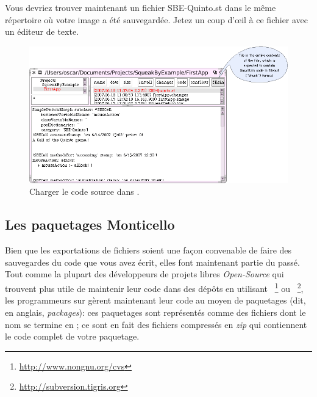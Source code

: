 \documentclass[a4paper,10pt,twoside]{book}
\begin{document}
Vous devriez trouver maintenant un fichier SBE-Quinto.st dans le m\^eme
répertoire o\`u votre image a été sauvegardée.
Jetez un coup d'\oe il à ce fichier avec un éditeur de texte.


\begin{figure}[ht]
\centerline {\includegraphics[width=\textwidth]{FileIn}}
\caption{Charger le code source dans \sq.
\label{fig:filein}}
\end{figure}

\subsection{Les paquetages Monticello}
Bien que les exportations de fichiers soient une façon convenable de
faire des sauvegardes du code que vous avez écrit, elles font
maintenant partie du passé.
Tout comme la plupart des développeurs de projets libres
\emph{Open-Source} qui trouvent plus utile de maintenir leur code dans
des dépôts en utilisant ~\footnote{\url{http://www.nongnu.org/cvs}}
ou ~\footnote{\url{http://subversion.tigris.org}}, les
programmeurs sur \sq gèrent maintenant leur code au moyen de
paquetages  (dit, en anglais, \emph{packages}): 
ces paquetages sont représentés comme des fichiers dont le nom se
termine en ; ce sont en fait des fichiers compressés en
\emph{zip} qui contiennent le code complet de votre paquetage.
\end{document}
